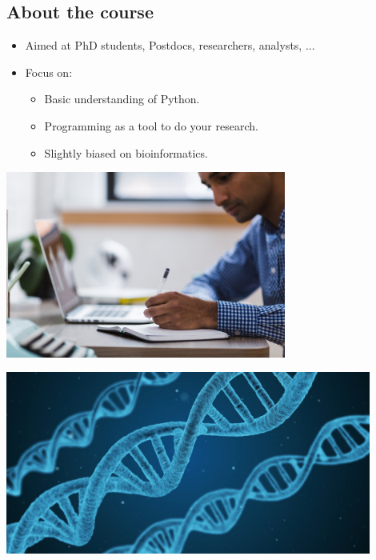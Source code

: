 \documentclass[aspectratio=1610,slidestop]{beamer}
\begin{document}
\subsection{About the course}
\begin{pframe}
 \begin{itemize}
  \item Aimed at PhD students, Postdocs, researchers, analysts, ...
  \item Focus on:
  \begin{itemize}
   \item Basic understanding of Python.
   \item Programming as a tool to do your research.
   \item Slightly biased on bioinformatics.
  \end{itemize}
 \end{itemize}
 \medskip

 \begin{minipage}{0.47\textwidth}
 \begin{center}
   \includegraphics[width=0.69\textwidth]{../../images/laptop_man.jpg}
 \end{center}
 \end{minipage}%
 \begin{minipage}{0.47\textwidth}
 \begin{center}
   \includegraphics[width=0.9\textwidth]{../../images/dna.jpg}
 \end{center}
 \end{minipage}

\end{pframe}
\end{document}
